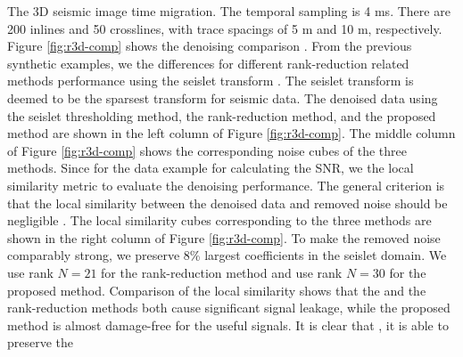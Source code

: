  The 3D seismic image  time migration.  The temporal sampling  is 4 ms.  There are 200 inlines and 50 crosslines, with trace spacings of 5 m and 10 m, respectively. Figure \ref{fig:r3d-comp} shows the denoising comparison . From the previous synthetic examples, we  the differences for different rank-reduction related methods performance using the seislet transform \cite[]{fomel2010seislet}. The seislet transform is deemed to be the sparsest transform for seismic data. The denoised data using the seislet thresholding method, the rank-reduction method, and the proposed method are shown in the left column of Figure \ref{fig:r3d-comp}. The middle column of Figure \ref{fig:r3d-comp} shows the corresponding noise cubes of the three methods. Since for the  data example\dlo{,}  for calculating the SNR, we   the local similarity metric to evaluate the denoising performance. The general criterion is that the local similarity between the denoised data and removed noise should be negligible . The local similarity cubes corresponding to the three methods are shown in the right column of Figure \ref{fig:r3d-comp}. To make the removed noise comparably strong, we preserve 8\% largest coefficients in the seislet domain. We use rank $N=21$ for the rank-reduction method and use rank $N=30$ for the proposed method. Comparison of the local similarity shows that the  and the rank-reduction methods both cause significant signal leakage, while the proposed method is almost damage-free for the useful signals. It is clear that , it is able to preserve the 
